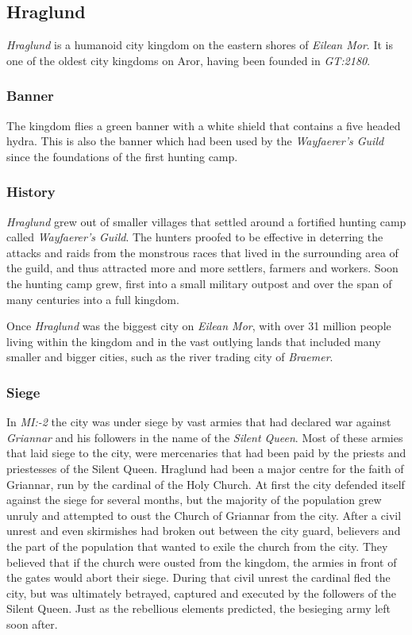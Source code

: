 \subsection*{Hraglund}

\emph{Hraglund} is a humanoid city kingdom on the eastern shores of
\emph{Eilean Mor}. It is one of the oldest city kingdoms on Aror, having been
founded in \emph{GT:2180}.

\subsubsection*{Banner}

The kingdom flies a green banner with a white shield that contains a five
headed hydra. This is also the banner which had been used by the
\emph{Wayfaerer's Guild} since the foundations of the first hunting camp.

\subsubsection*{History}

\emph{Hraglund} grew out of smaller villages that settled around a fortified
hunting camp called \emph{Wayfaerer's Guild}. The hunters proofed to be
effective in deterring the attacks and raids from the monstrous races that
lived in the surrounding area of the guild, and thus attracted more and more
settlers, farmers and workers. Soon the hunting camp grew, first into a small
military outpost and over the span of many centuries into a full kingdom.

Once \emph{Hraglund} was the biggest city on \emph{Eilean Mor}, with over
31 million people living within the kingdom and in the vast outlying lands
that included many smaller and bigger cities, such as the river trading city
of \emph{Braemer}.

\subsubsection*{Siege}

In \emph{MI:-2} the city was under siege by vast armies that had declared war
against \emph{Griannar} and his followers in the name of the
\emph{Silent Queen}. Most of these armies that laid siege to the city, were
mercenaries that had been paid by the priests and priestesses of the Silent
Queen. Hraglund had been a major centre for the faith of Griannar, run by the
cardinal of the Holy Church. At first the city defended itself against the
siege for several months, but the majority of the population grew unruly and
attempted to oust the Church of Griannar from the city. After a civil unrest
and even skirmishes had broken out between the city guard, believers and the
part of the population that wanted to exile the church from the city. They
believed that if the church were ousted from the kingdom, the armies in front
of the gates would abort their siege. During that civil unrest the cardinal
fled the city, but was ultimately betrayed, captured and executed by the
followers of the Silent Queen. Just as the rebellious elements predicted, the
besieging army left soon after.

